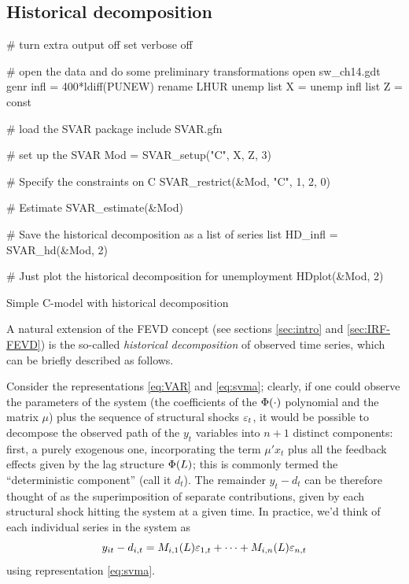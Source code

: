 \documentclass[a4paper,10pt]{article}
\newcommand{\StS}[1]{\ensuremath \varepsilon_{#1}} %
\newcommand{\VarSym}{\ensuremath \Phi}
\begin{document}
\subsection{Historical decomposition}
\label{sec:HD}

\begin{table}[htbp]
\begin{scode}
# turn extra output off
set verbose off

# open the data and do some preliminary transformations
open sw_ch14.gdt
genr infl = 400*ldiff(PUNEW)
rename LHUR unemp
list X = unemp infl
list Z = const

# load the SVAR package
include SVAR.gfn

# set up the SVAR
Mod = SVAR_setup("C", X, Z, 3)

# Specify the constraints on C
SVAR_restrict(&Mod, "C", 1, 2, 0)

# Estimate
SVAR_estimate(&Mod)

# Save the historical decomposition as a list of series
list HD_infl = SVAR_hd(&Mod, 2)

# Just plot the historical decomposition for unemployment
HDplot(&Mod, 2)
\end{scode}
  \caption{Simple C-model with historical decomposition}
  \label{tab:simpleC-hd}
\end{table}

A natural extension of the FEVD concept (see
sections \ref{sec:intro} and \ref{sec:IRF-FEVD}) is the so-called
\emph{historical decomposition} of observed time series, which can be
briefly described as follows.

Consider the representations \eqref{eq:VAR} and \eqref{eq:svma};
clearly, if one could observe the parameters of the system (the
coefficients of the $\VarSym(\cdot)$ polynomial and the matrix $\mu$) plus
the sequence of structural shocks $\StS{t}$, it would be possible to
decompose the observed path of the $y_t$ variables into $n + 1$
distinct components: first, a purely exogenous one, incorporating the
term $\mu' x_t$ plus all the feedback effects given by the lag
structure $\VarSym(L)$; this is commonly termed the ``deterministic
component'' (call it $d_t$). The remainder $y_t - d_t$ can be
therefore thought of as the superimposition of separate contributions,
given by each structural shock hitting the system at a given time. In
practice, we'd think of each individual series in the system as
\[
 y_{it} - d_{i,t} = M_{i,1}(L) \StS{1,t} + \cdots + M_{i,n}(L) \StS{n,t} 
\]
using representation \eqref{eq:svma}. 
\end{document}
